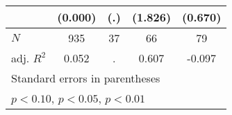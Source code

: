 {\begin{tabular}{l*{4}{c}}
            &     (0.000)         &         (.)         &     (1.826)         &     (0.670)         \\
\hline
\(N\)       &         935         &          37         &          66         &          79         \\
adj. \(R^{2}\)&       0.052         &           .         &       0.607         &      -0.097         \\
\hline\hline
\multicolumn{5}{l}{\footnotesize Standard errors in parentheses}\\
\multicolumn{5}{l}{\footnotesize \sym{*} \(p<0.10\), \sym{**} \(p<0.05\), \sym{***} \(p<0.01\)}\\
\end{tabular}
}
